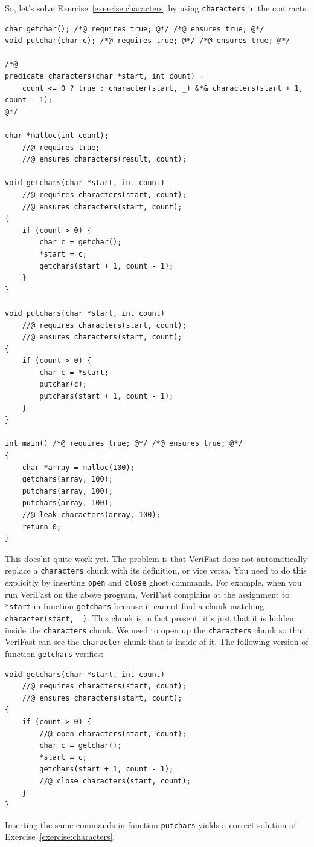 \documentclass{article}
\begin{document}
So, let's solve Exercise~\ref{exercise:characters} by using \lstinline!characters! in the contracts:
\begin{lstlisting}
char getchar(); /*@ requires true; @*/ /*@ ensures true; @*/
void putchar(char c); /*@ requires true; @*/ /*@ ensures true; @*/

/*@
predicate characters(char *start, int count) =
    count <= 0 ? true : character(start, _) &*& characters(start + 1, count - 1);
@*/

char *malloc(int count);
    //@ requires true;
    //@ ensures characters(result, count);

void getchars(char *start, int count)
    //@ requires characters(start, count);
    //@ ensures characters(start, count);
{
    if (count > 0) {
        char c = getchar();
        *start = c;
        getchars(start + 1, count - 1);
    }
}

void putchars(char *start, int count)
    //@ requires characters(start, count);
    //@ ensures characters(start, count);
{
    if (count > 0) {
        char c = *start;
        putchar(c);
        putchars(start + 1, count - 1);
    }
}

int main() /*@ requires true; @*/ /*@ ensures true; @*/
{
    char *array = malloc(100);
    getchars(array, 100);
    putchars(array, 100);
    putchars(array, 100);
    //@ leak characters(array, 100);
    return 0;
}
\end{lstlisting}
This does'nt quite work yet. The problem is that VeriFast does not automatically replace a \lstinline!characters! chunk with its definition, or vice versa. You need to do this explicitly by inserting
\lstinline!open! and \lstinline!close! ghost commands. For example, when you run VeriFast on the above program, VeriFast complains at the assignment to \lstinline!*start! in function
\lstinline!getchars! because it cannot find a chunk matching \lstinline!character(start, _)!. This chunk is in fact present; it's just that it is hidden inside the \lstinline!characters! chunk. We need to
open up the \lstinline!characters! chunk so that VeriFast can see the \lstinline!character! chunk that is inside of it.
The following version of function \lstinline!getchars! verifies:
\begin{lstlisting}
void getchars(char *start, int count)
    //@ requires characters(start, count);
    //@ ensures characters(start, count);
{
    if (count > 0) {
        //@ open characters(start, count);
        char c = getchar();
        *start = c;
        getchars(start + 1, count - 1);
        //@ close characters(start, count);
    }
}
\end{lstlisting}
Inserting the same commands in function \lstinline!putchars! yields a correct solution of Exercise~\ref{exercise:characters}.
\end{document}
